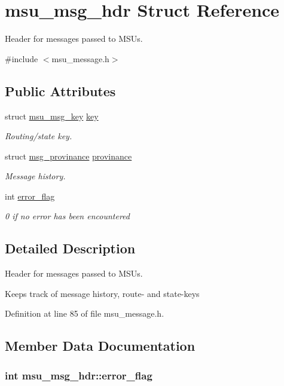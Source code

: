 \hypertarget{structmsu__msg__hdr}{\section{msu\-\_\-msg\-\_\-hdr Struct Reference}
\label{structmsu__msg__hdr}
}


Header for messages passed to M\-S\-Us.  




{\ttfamily \#include $<$msu\-\_\-message.\-h$>$}

\subsection*{Public Attributes}
\begin{DoxyCompactItemize}
\item 
struct \hyperlink{structmsu__msg__key}{msu\-\_\-msg\-\_\-key} \hyperlink{structmsu__msg__hdr_a4fdc31ee60340dd9b2550df651fb185a}{key}
\begin{DoxyCompactList}\small\item\em Routing/state key. \end{DoxyCompactList}\item 
struct \hyperlink{structmsg__provinance}{msg\-\_\-provinance} \hyperlink{structmsu__msg__hdr_ab64c7b4c508dd04d23bbd940cd6dabea}{provinance}
\begin{DoxyCompactList}\small\item\em Message history. \end{DoxyCompactList}\item 
int \hyperlink{structmsu__msg__hdr_a254483afe24cc34da7244aa0d9201879}{error\-\_\-flag}
\begin{DoxyCompactList}\small\item\em 0 if no error has been encountered \end{DoxyCompactList}\end{DoxyCompactItemize}


\subsection{Detailed Description}
Header for messages passed to M\-S\-Us. 

Keeps track of message history, route-\/ and state-\/keys 

Definition at line 85 of file msu\-\_\-message.\-h.



\subsection{Member Data Documentation}
\hypertarget{structmsu__msg__hdr_a254483afe24cc34da7244aa0d9201879}{
\subsubsection[{error\-\_\-flag}]{\setlength{\rightskip}{0pt plus 5cm}int msu\-\_\-msg\-\_\-hdr\-::error\-\_\-flag}}\label{structmsu__msg__hdr_a254483afe24cc34da7244aa0d9201879}


